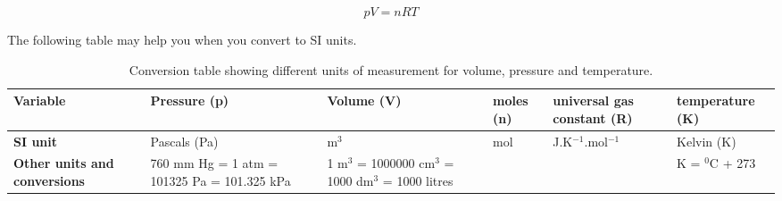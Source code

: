 \begin{equation*}
pV = nRT
\end{equation*}


The following table may help you when you convert to SI units.

\begin{table}[h]
\caption{Conversion table showing different units of measurement for volume, pressure and temperature.}
\label{tab:gas:units}
\begin{center}
\begin{tabular}{|p{2cm}|p{2cm}|p{2cm}|p{2cm}|p{2cm}|p{2cm}|}\hline
\textbf{Variable} & Pressure (\textbf{p}) & Volume (\textbf{V}) & moles (\textbf{n}) & universal gas constant (\textbf{R}) & temperature (\textbf{K})\\\hline
\textbf{SI unit} & Pascals (Pa) & m$^{3}$ & mol & J.K$^{-1}$.mol$^{-1}$ & Kelvin (K) \\\hline
\textbf{Other units and conversions} & 760 mm Hg = 1 atm = 101325 Pa = 101.325 kPa & 1 m$^{3}$ = 1000000 cm$^{3}$ = 1000 dm$^{3}$ = 1000 litres &  &  & K = $^{0}$C + 273 \\\hline
\end{tabular}
\end{center}
\end{table}

